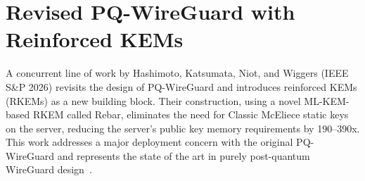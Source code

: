 \section{Revised PQ-WireGuard with Reinforced KEMs}

A concurrent line of work by Hashimoto, Katsumata, Niot, and Wiggers (IEEE S\&P 2026) revisits the design of PQ-WireGuard and introduces reinforced KEMs (RKEMs) as a new building block. Their construction, using a novel ML-KEM-based RKEM called Rebar, eliminates the need for Classic McEliece static keys on the server, reducing the server's public key memory requirements by 190--390x. This work addresses a major deployment concern with the original PQ-WireGuard and represents the state of the art in purely post-quantum WireGuard design~\cite{hashimoto2026rkem}.
